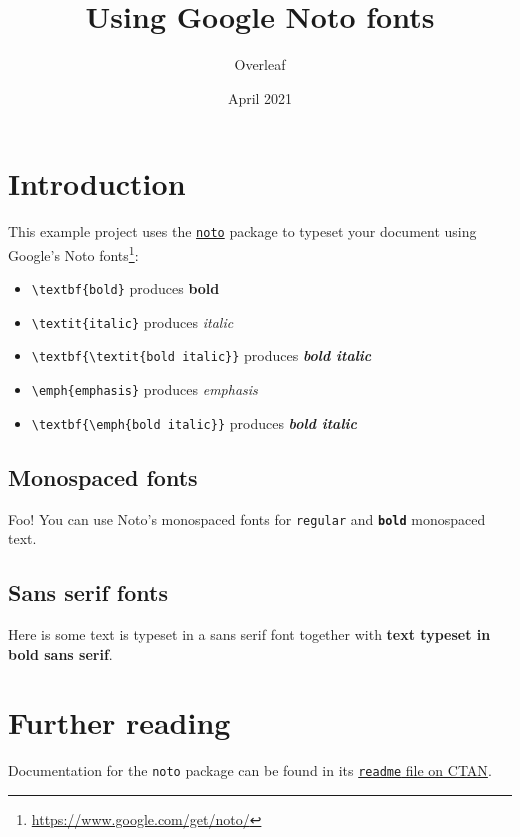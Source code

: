 \documentclass{article}
\title{Using Google Noto fonts}
\author{Overleaf}
\date{April 2021}
\begin{document}
\maketitle

\section{Introduction}
This example project uses the \href{https://ctan.org/pkg/noto?lang=en}{\color{blue}\texttt{noto}} package to typeset your document using Google's Noto fonts\footnote{\url{https://www.google.com/get/noto/}}:
\begin{itemize}
\item \verb|\textbf{bold}| produces \textbf{bold}
\item \verb|\textit{italic}| produces \textit{italic}
\item \verb|\textbf{\textit{bold italic}}| produces \textbf{\textit{bold italic}}
\item \verb|\emph{emphasis}| produces \emph{emphasis}
\item \verb|\textbf{\emph{bold italic}}| produces \textbf{\emph{bold italic}}
\end{itemize}

\subsection{Monospaced fonts}
{\fontsize{50}{60}\selectfont Foo!}
You can use Noto's monospaced fonts for \texttt{regular} and \texttt{\textbf{bold}} monospaced text.

\subsection{Sans serif fonts}
Here is some \textsf{text is typeset in a sans serif font} together with \textbf{\textsf{text typeset in bold sans serif}}.

\section{Further reading}
Documentation for the \texttt{noto} package can be found in its \href{http://mirrors.ctan.org/fonts/noto/README}{\color{blue}\texttt{readme} file on CTAN}.
\end{document}
